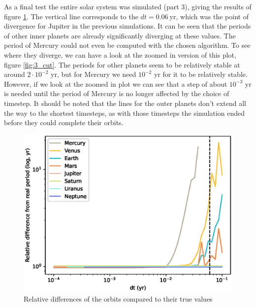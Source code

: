 \documentclass[a4paper]{article}
\begin{document}
\FloatBarrier
As a final test the entire solar system was simulated (part 3), giving the results of figure \ref{fig:3}.
The vertical line corresponds to the $dt = 0.06 \ \text{yr}$, which was the point of divergence for Jupiter in the previous simulations.
It can be seen that the periods of other inner planets are already significantly diverging at these values.
The period of Mercury could not even be computed with the chosen algorithm.
To see where they diverge, we can have a look at the zoomed in version of this plot, figure \ref{fig:3_cut}.
The periods for other planets seem to be relatively stable at around $2 \cdot 10^{-2}$ yr, but for Mercury we need $10^{-2}$ yr for it to be relatively stable.
However, if we look at the zoomed in plot we can see that a step of about $10^{-3}$ yr is needed until the period of Mercury is no longer affected by the choice of timestep.
It should be noted that the lines for the outer planets don't extend all the way to the shortest timesteps, as with those timesteps the simulation ended before they could complete their orbits.

\begin{figure}[ht!]
\centering
\includegraphics[width=\textwidth]{fig_3_rel.eps}
\caption{Relative differences of the orbits compared to their true values}
\label{fig:3}
\end{figure}
\end{document}
